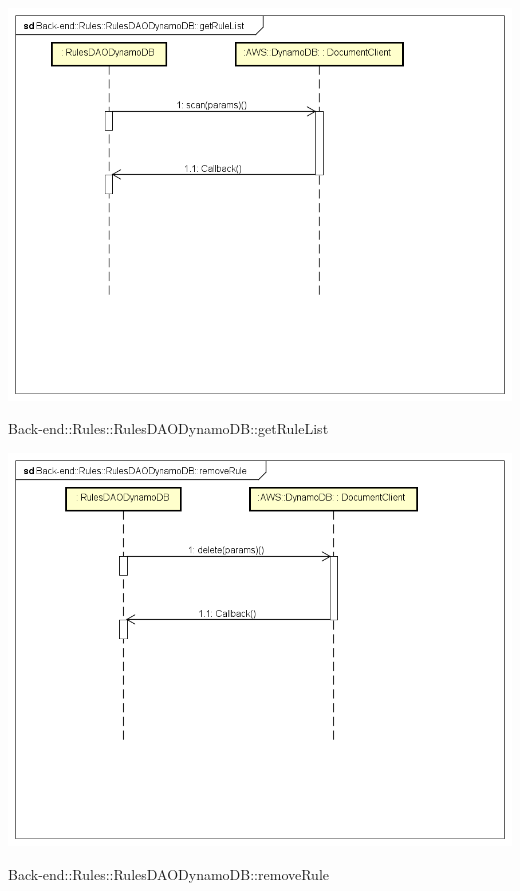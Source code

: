 \includegraphics[width=\textwidth,height=\textheight,keepaspectratio]{images/diagrams/back-end/Ufficial_Backend/Back-end__Rules__RulesDAODynamoDB__getRuleList.png} 	\caption{Back-end::Rules::RulesDAODynamoDB::getRuleList}
\includegraphics[width=\textwidth,height=\textheight,keepaspectratio]{images/diagrams/back-end/Ufficial_Backend/Back-end__Rules__RulesDAODynamoDB__removeRule.png} 	\caption{Back-end::Rules::RulesDAODynamoDB::removeRule}
